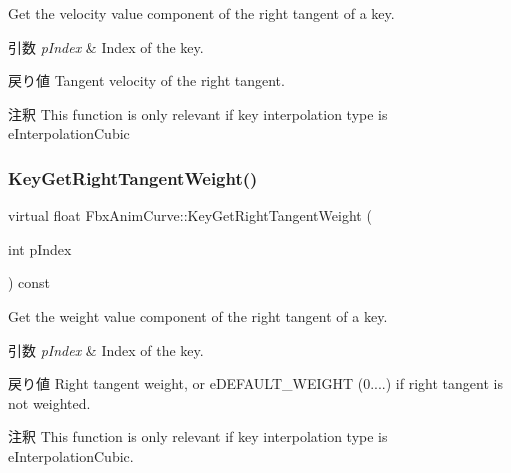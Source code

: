Get the velocity value component of the right tangent of a key. 
\begin{DoxyParams}{引数}
{\em p\+Index} & Index of the key. \\
\hline
\end{DoxyParams}
\begin{DoxyReturn}{戻り値}
Tangent velocity of the right tangent. 
\end{DoxyReturn}
\begin{DoxyRemark}{注釈}
This function is only relevant if key interpolation type is e\+Interpolation\+Cubic 
\end{DoxyRemark}
\mbox{\label{class_fbx_anim_curve_a82f1cd10ca027ec52eb0facf47b9c9f4}} 
\subsubsection{\texorpdfstring{Key\+Get\+Right\+Tangent\+Weight()}{KeyGetRightTangentWeight()}}
{\footnotesize\ttfamily virtual float Fbx\+Anim\+Curve\+::\+Key\+Get\+Right\+Tangent\+Weight (\begin{DoxyParamCaption}\item[{int}]{p\+Index }\end{DoxyParamCaption}) const\hspace{0.3cm}{\ttfamily [pure virtual]}}

Get the weight value component of the right tangent of a key. 
\begin{DoxyParams}{引数}
{\em p\+Index} & Index of the key. \\
\hline
\end{DoxyParams}
\begin{DoxyReturn}{戻り値}
Right tangent weight, or e\+D\+E\+F\+A\+U\+L\+T\+\_\+\+W\+E\+I\+G\+HT (0....) if right tangent is not weighted. 
\end{DoxyReturn}
\begin{DoxyRemark}{注釈}
This function is only relevant if key interpolation type is e\+Interpolation\+Cubic. 
\end{DoxyRemark}
\mbox{\label{class_fbx_anim_curve_a5672d86518e0ceb21c4bcaf78f7f5bf6}} 
